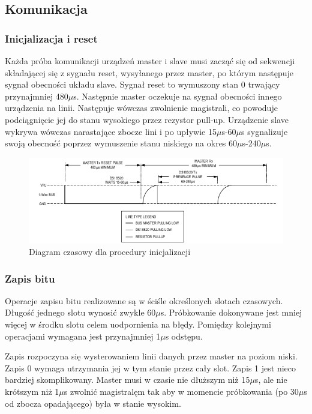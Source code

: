 \documentclass[a4paper]{article}
\begin{document}
\subsection{Komunikacja}

\subsubsection{Inicjalizacja i reset}

Każda próba komunikacji urządzeń master i slave musi zacząć się od sekwencji składającej się z sygnału reset, wysyłanego przez master, po którym następuje sygnał obecności układu slave. Sygnał reset to wymuszony stan 0 trwający przynajmniej 480$\mu$s. Następnie master oczekuje na sygnał obecności innego urządzenia na linii. Następuje wówczas zwolnienie magistrali, co powoduje podciągnięcie jej do stanu wysokiego przez rezystor pull-up. Urządzenie slave wykrywa wówczas narastające zbocze lini i po upływie 15$\mu$s-60$\mu$s sygnalizuje swoją obecność poprzez wymuszenie stanu niskiego na okres 60$\mu$s-240$\mu$s.

\begin{figure}[!h]
\begin{center}
\includegraphics[scale=0.4]{graphics/init.png}
\end{center}
\caption{Diagram czasowy dla procedury inicjalizacji}
\label{inititming}
\end{figure}

\subsubsection{Zapis bitu}
Operacje zapisu bitu realizowane są w ściśle określonych slotach czasowych. Długość jednego slotu wynosić zwykle 60$\mu$s. Próbkowanie dokonywane jest mniej więcej w środku slotu celem uodpornienia na błędy. Pomiędzy kolejnymi operacjami wymagana jest przynajmniej 1$\mu$s odstępu.

Zapis rozpoczyna się wysterowaniem linii danych przez master na poziom niski. Zapis 0 wymaga utrzymania jej w tym stanie przez cały slot. Zapis 1 jest nieco bardziej skomplikowany. Master musi w czasie nie dłuższym niż 15$\mu$s, ale nie krótszym niż 1$\mu$s zwolnić magistralęm tak aby w momencie próbkowania (po 30$\mu$s od zbocza opadającego) była w stanie wysokim. 
\end{document}
